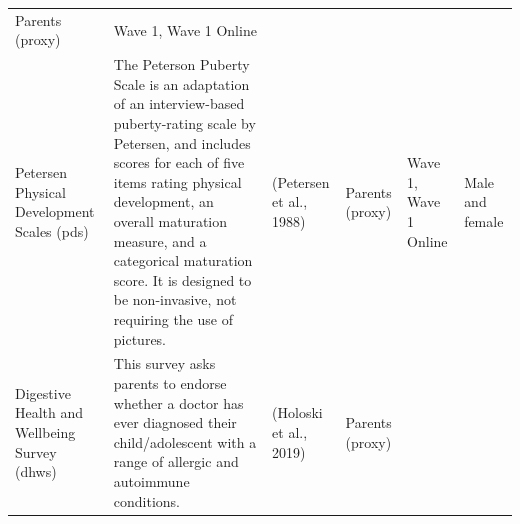 \documentclass[
]{book}
\begin{document}
\begin{longtable}[]{@{}llllll@{}}
\begin{minipage}[t]{0.16\columnwidth}
Parents (proxy)\strut
\end{minipage} & \begin{minipage}[t]{0.06\columnwidth}\raggedright
Wave 1, Wave 1 Online\strut
\end{minipage} & \begin{minipage}[t]{0.10\columnwidth}\raggedright
\strut
\end{minipage}\tabularnewline
\begin{minipage}[t]{0.18\columnwidth}\raggedright
Petersen Physical Development Scales (pds)\strut
\end{minipage} & \begin{minipage}[t]{0.18\columnwidth}\raggedright
The Peterson Puberty Scale is an adaptation of an interview-based puberty-rating scale by Petersen, and includes scores for each of five items rating physical development, an overall maturation measure, and a categorical maturation score. It is designed to be non-invasive, not requiring the use of pictures.\strut
\end{minipage} & \begin{minipage}[t]{0.15\columnwidth}\raggedright
(Petersen et al., 1988)\strut
\end{minipage} & \begin{minipage}[t]{0.16\columnwidth}\raggedright
Parents (proxy)\strut
\end{minipage} & \begin{minipage}[t]{0.06\columnwidth}\raggedright
Wave 1, Wave 1 Online\strut
\end{minipage} & \begin{minipage}[t]{0.10\columnwidth}\raggedright
Male and female\strut
\end{minipage}\tabularnewline
\begin{minipage}[t]{0.18\columnwidth}\raggedright
Digestive Health and Wellbeing Survey (dhws)\strut
\end{minipage} & \begin{minipage}[t]{0.18\columnwidth}\raggedright
This survey asks parents to endorse whether a doctor has ever diagnosed their child/adolescent with a range of allergic and autoimmune conditions.\strut
\end{minipage} & \begin{minipage}[t]{0.15\columnwidth}\raggedright
(Holoski et al., 2019)\strut
\end{minipage} & \begin{minipage}[t]{0.16\columnwidth}\raggedright
Parents (proxy)\strut
\end{minipage} & \begin{minipage}[t]{0.06\columnwidth}\raggedright

\end{minipage}
\end{longtable}
\end{document}
